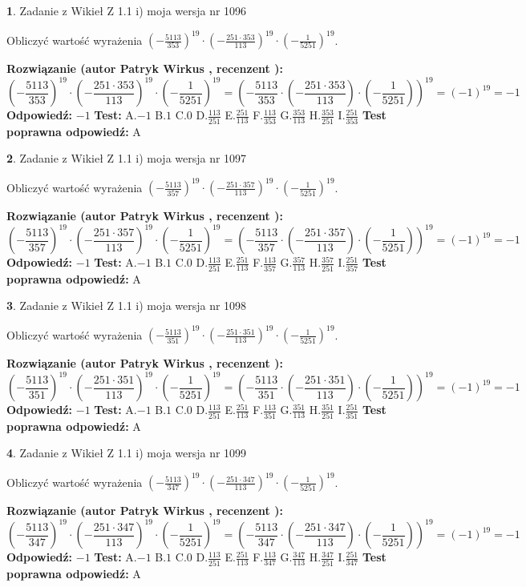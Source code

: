\documentclass[12pt, a4paper]{article}
\theoremstyle{definition} %
\newtheorem{zad}{}
\newcommand{\zadStart}[1]{\begin{zad}#1\newline}
\newcommand{\zadStop}{\end{zad}}
\newcommand{\rozwStart}[2]{\noindent \textbf{Rozwiązanie (autor #1 , recenzent #2): }\newline}
\newcommand{\rozwStop}{\newline}
\newcommand{\odpStart}{\noindent \textbf{Odpowiedź:}\newline}
\newcommand{\odpStop}{\newline}
\newcommand{\testStart}{\noindent \textbf{Test:}\newline}
\newcommand{\testStop}{\newline}
\newcommand{\kluczStart}{\noindent \textbf{Test poprawna odpowiedź:}\newline}
\newcommand{\kluczStop}{\newline}
\begin{document}
\zadStart{Zadanie z Wikieł Z 1.1 i) moja wersja nr 1096}

Obliczyć wartość wyrażenia $(-\frac{5113}{353})^{19} \cdot (-\frac{251 \cdot 353}{113})^{19} \cdot (-\frac{1}{5251})^{19}$.
\zadStop
\rozwStart{Patryk Wirkus}{}
$$(-\frac{5113}{353})^{19} \cdot (-\frac{251 \cdot 353}{113})^{19} \cdot (-\frac{1}{5251})^{19} = (-\frac{5113}{353} \cdot (-\frac{251 \cdot 353}{113}) \cdot (-\frac{1}{5251}))^{19} = (-1)^{19} = -1$$
\rozwStop
\odpStart
$-1$
\odpStop
\testStart
A.$-1$ B.$1$ C.$0$ D.$\frac{113}{251}$ E.$\frac{251}{113}$
F.$\frac{113}{353}$ G.$\frac{353}{113}$
H.$\frac{353}{251}$
I.$\frac{251}{353}$
\testStop
\kluczStart
A
\kluczStop



\zadStart{Zadanie z Wikieł Z 1.1 i) moja wersja nr 1097}

Obliczyć wartość wyrażenia $(-\frac{5113}{357})^{19} \cdot (-\frac{251 \cdot 357}{113})^{19} \cdot (-\frac{1}{5251})^{19}$.
\zadStop
\rozwStart{Patryk Wirkus}{}
$$(-\frac{5113}{357})^{19} \cdot (-\frac{251 \cdot 357}{113})^{19} \cdot (-\frac{1}{5251})^{19} = (-\frac{5113}{357} \cdot (-\frac{251 \cdot 357}{113}) \cdot (-\frac{1}{5251}))^{19} = (-1)^{19} = -1$$
\rozwStop
\odpStart
$-1$
\odpStop
\testStart
A.$-1$ B.$1$ C.$0$ D.$\frac{113}{251}$ E.$\frac{251}{113}$
F.$\frac{113}{357}$ G.$\frac{357}{113}$
H.$\frac{357}{251}$
I.$\frac{251}{357}$
\testStop
\kluczStart
A
\kluczStop



\zadStart{Zadanie z Wikieł Z 1.1 i) moja wersja nr 1098}

Obliczyć wartość wyrażenia $(-\frac{5113}{351})^{19} \cdot (-\frac{251 \cdot 351}{113})^{19} \cdot (-\frac{1}{5251})^{19}$.
\zadStop
\rozwStart{Patryk Wirkus}{}
$$(-\frac{5113}{351})^{19} \cdot (-\frac{251 \cdot 351}{113})^{19} \cdot (-\frac{1}{5251})^{19} = (-\frac{5113}{351} \cdot (-\frac{251 \cdot 351}{113}) \cdot (-\frac{1}{5251}))^{19} = (-1)^{19} = -1$$
\rozwStop
\odpStart
$-1$
\odpStop
\testStart
A.$-1$ B.$1$ C.$0$ D.$\frac{113}{251}$ E.$\frac{251}{113}$
F.$\frac{113}{351}$ G.$\frac{351}{113}$
H.$\frac{351}{251}$
I.$\frac{251}{351}$
\testStop
\kluczStart
A
\kluczStop



\zadStart{Zadanie z Wikieł Z 1.1 i) moja wersja nr 1099}

Obliczyć wartość wyrażenia $(-\frac{5113}{347})^{19} \cdot (-\frac{251 \cdot 347}{113})^{19} \cdot (-\frac{1}{5251})^{19}$.
\zadStop
\rozwStart{Patryk Wirkus}{}
$$(-\frac{5113}{347})^{19} \cdot (-\frac{251 \cdot 347}{113})^{19} \cdot (-\frac{1}{5251})^{19} = (-\frac{5113}{347} \cdot (-\frac{251 \cdot 347}{113}) \cdot (-\frac{1}{5251}))^{19} = (-1)^{19} = -1$$
\rozwStop
\odpStart
$-1$
\odpStop
\testStart
A.$-1$ B.$1$ C.$0$ D.$\frac{113}{251}$ E.$\frac{251}{113}$
F.$\frac{113}{347}$ G.$\frac{347}{113}$
H.$\frac{347}{251}$
I.$\frac{251}{347}$
\testStop
\kluczStart
A
\kluczStop
\end{document}
